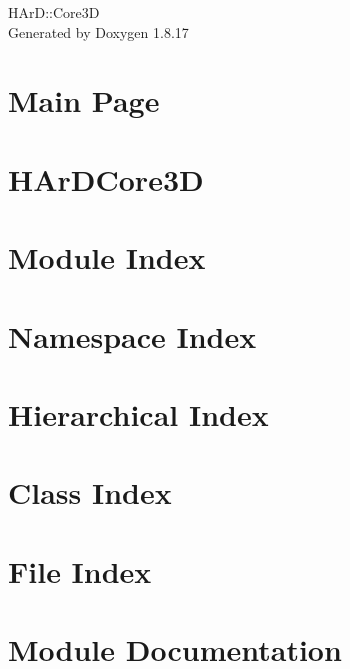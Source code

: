 \let\mypdfximage\pdfximage\def\pdfximage{\immediate\mypdfximage}\documentclass[twoside]{book}
\newcommand{\+}{\discretionary{\mbox{\scriptsize$\hookleftarrow$}}{}{}}
\newcommand{\clearemptydoublepage}{%
  \newpage{\pagestyle{empty}\cleardoublepage}%
}
\begin{document}
\hypersetup{pageanchor=false,
             bookmarksnumbered=true,
             pdfencoding=unicode
            }
\begin{titlepage}
\vspace*{7cm}
\begin{center}%
{\Large H\+ArD\+::Core3D }\\
\vspace*{1cm}
{\large Generated by Doxygen 1.8.17}\\
\end{center}
\end{titlepage}
\clearemptydoublepage
{}
\tableofcontents
\clearemptydoublepage
{}
\hypersetup{pageanchor=true}

\chapter{Main Page}
\label{index}\hypertarget{index}{}
\chapter{H\+Ar\+D\+Core3D}
\label{md_README}

\chapter{Module Index}

\chapter{Namespace Index}

\chapter{Hierarchical Index}

\chapter{Class Index}

\chapter{File Index}

\chapter{Module Documentation}

















\end{document}
